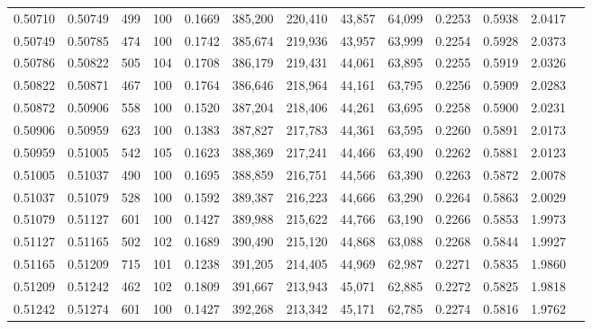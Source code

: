 \begin{tabular}{rrrrrrrrrrrrr}
0.50710 & 0.50749 &   499 & 100 &                                     0.1669 & 385,200 & 220,410 &  43,857 &  64,099 & 0.2253 & 0.5938 & 2.0417 \\
0.50749 & 0.50785 &   474 & 100 &                                     0.1742 & 385,674 & 219,936 &  43,957 &  63,999 & 0.2254 & 0.5928 & 2.0373 \\
0.50786 & 0.50822 &   505 & 104 &                                     0.1708 & 386,179 & 219,431 &  44,061 &  63,895 & 0.2255 & 0.5919 & 2.0326 \\
0.50822 & 0.50871 &   467 & 100 &                                     0.1764 & 386,646 & 218,964 &  44,161 &  63,795 & 0.2256 & 0.5909 & 2.0283 \\
0.50872 & 0.50906 &   558 & 100 &                                     0.1520 & 387,204 & 218,406 &  44,261 &  63,695 & 0.2258 & 0.5900 & 2.0231 \\
0.50906 & 0.50959 &   623 & 100 &                                     0.1383 & 387,827 & 217,783 &  44,361 &  63,595 & 0.2260 & 0.5891 & 2.0173 \\
0.50959 & 0.51005 &   542 & 105 &                                     0.1623 & 388,369 & 217,241 &  44,466 &  63,490 & 0.2262 & 0.5881 & 2.0123 \\
0.51005 & 0.51037 &   490 & 100 &                                     0.1695 & 388,859 & 216,751 &  44,566 &  63,390 & 0.2263 & 0.5872 & 2.0078 \\
0.51037 & 0.51079 &   528 & 100 &                                     0.1592 & 389,387 & 216,223 &  44,666 &  63,290 & 0.2264 & 0.5863 & 2.0029 \\
0.51079 & 0.51127 &   601 & 100 &                                     0.1427 & 389,988 & 215,622 &  44,766 &  63,190 & 0.2266 & 0.5853 & 1.9973 \\
0.51127 & 0.51165 &   502 & 102 &                                     0.1689 & 390,490 & 215,120 &  44,868 &  63,088 & 0.2268 & 0.5844 & 1.9927 \\
0.51165 & 0.51209 &   715 & 101 &                                     0.1238 & 391,205 & 214,405 &  44,969 &  62,987 & 0.2271 & 0.5835 & 1.9860 \\
0.51209 & 0.51242 &   462 & 102 &                                     0.1809 & 391,667 & 213,943 &  45,071 &  62,885 & 0.2272 & 0.5825 & 1.9818 \\
0.51242 & 0.51274 &   601 & 100 &                                     0.1427 & 392,268 & 213,342 &  45,171 &  62,785 & 0.2274 & 0.5816 & 1.9762 \\

\end{tabular}
